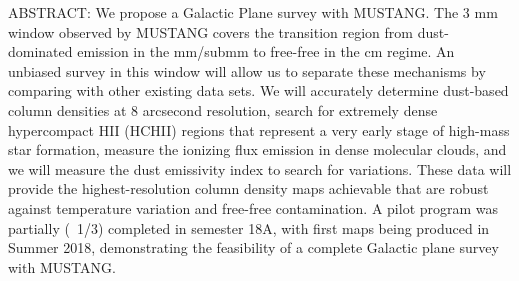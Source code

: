 \documentclass[11pt,preprint]{aastex_nofoot}
\begin{document}
ABSTRACT:
We propose a Galactic Plane survey with MUSTANG.  The 3 mm window observed by
MUSTANG covers the transition region from dust-dominated emission in the
mm/submm to free-free in the cm regime.  An unbiased survey in this window will
allow us to separate these mechanisms by comparing with other existing data
sets.  We will accurately determine dust-based column densities at 8 arcsecond
resolution,  search for extremely dense hypercompact HII (HCHII) regions that
represent a very early stage of high-mass star formation, measure the ionizing
flux emission in dense molecular clouds, and we will measure the
dust emissivity index to search for variations. These data will provide the
highest-resolution column density maps achievable that are robust against
temperature variation and free-free contamination.  A pilot program was
partially (~1/3) completed in semester 18A, with first maps being produced in
Summer 2018, demonstrating the feasibility of a complete Galactic plane survey
with MUSTANG.


\end{document}
